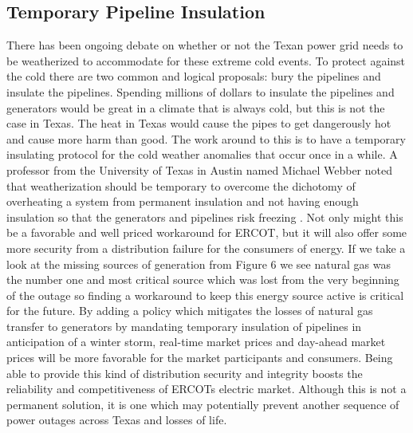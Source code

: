 \documentclass[12pt]{article}
\begin{document}
\subsection{Temporary Pipeline Insulation}
\indent
\indent There has been ongoing debate on whether or not the Texan power grid needs to be weatherized to accommodate for these extreme cold events. To protect against the cold there are two common and logical proposals: bury the pipelines and insulate the pipelines. Spending millions of dollars to insulate the pipelines and generators would be great in a climate that is always cold, but this is not the case in Texas. The heat in Texas would cause the pipes to get dangerously hot and cause more harm than good. The work around to this is to have a temporary insulating protocol for the cold weather anomalies that occur once in a while. A professor from the University of Texas in Austin named Michael Webber noted that weatherization should be temporary to overcome the dichotomy of  overheating a system from permanent insulation and not having enough insulation so that the generators and pipelines risk freezing \cite{mikeWeb}. Not only might this be a favorable and well priced workaround for ERCOT, but it will also offer some more security from a distribution failure for the consumers of energy. If we take a look at the missing sources of generation from Figure 6 we see natural gas was the number one and most critical source which was lost from the very beginning of the outage so finding a workaround to keep this energy source active is critical for the future. By adding a policy which mitigates the losses of natural gas transfer to generators by mandating temporary insulation of pipelines in anticipation of a winter storm, real-time market prices and day-ahead market prices will be more favorable for the market participants and consumers. Being able to provide this kind of distribution security and integrity boosts the reliability and competitiveness of ERCOTs electric market. Although this is not a permanent solution, it is one which may potentially prevent another sequence of power outages across Texas and losses of life. 
\end{document}
